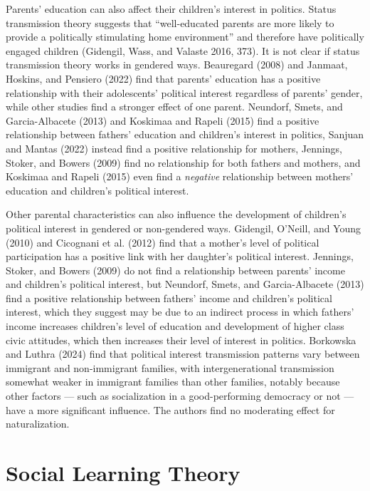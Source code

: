 \documentclass[
  letterpaper,
  DIV=11,
  numbers=noendperiod]{scrreprt}
\begin{document}
Parents' education can also affect their children's interest in
politics. Status transmission theory suggests that ``well-educated
parents are more likely to provide a politically stimulating home
environment'' and therefore have politically engaged children (Gidengil,
Wass, and Valaste 2016, 373). It is not clear if status transmission
theory works in gendered ways. Beauregard (2008) and Janmaat, Hoskins,
and Pensiero (2022) find that parents' education has a positive
relationship with their adolescents' political interest regardless of
parents' gender, while other studies find a stronger effect of one
parent. Neundorf, Smets, and Garcia-Albacete (2013) and Koskimaa and
Rapeli (2015) find a positive relationship between fathers' education
and children's interest in politics, Sanjuan and Mantas (2022) instead
find a positive relationship for mothers, Jennings, Stoker, and Bowers
(2009) find no relationship for both fathers and mothers, and Koskimaa
and Rapeli (2015) even find a \emph{negative} relationship between
mothers' education and children's political interest.

Other parental characteristics can also influence the development of
children's political interest in gendered or non-gendered ways.
Gidengil, O'Neill, and Young (2010) and Cicognani et al. (2012) find
that a mother's level of political participation has a positive link
with her daughter's political interest. Jennings, Stoker, and Bowers
(2009) do not find a relationship between parents' income and children's
political interest, but Neundorf, Smets, and Garcia-Albacete (2013) find
a positive relationship between fathers' income and children's political
interest, which they suggest may be due to an indirect process in which
fathers' income increases children's level of education and development
of higher class civic attitudes, which then increases their level of
interest in politics. Borkowska and Luthra (2024) find that political
interest transmission patterns vary between immigrant and non-immigrant
families, with intergenerational transmission somewhat weaker in
immigrant families than other families, notably because other factors
--- such as socialization in a good-performing democracy or not --- have
a more significant influence. The authors find no moderating effect for
naturalization.

\section{Social Learning Theory}\label{social-learning-theory-1}
\end{document}
